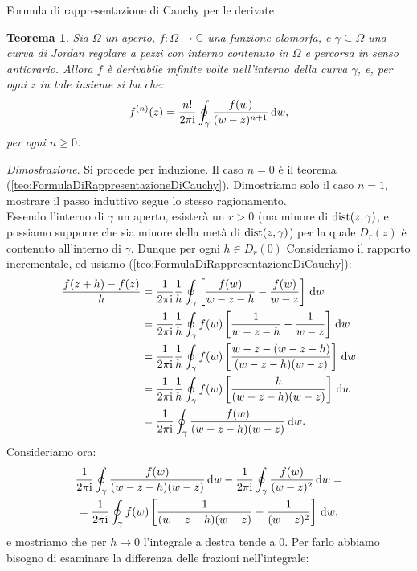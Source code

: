 \documentclass[11pt]{book}
\makeatletter
\theoremstyle{Definizione}
\theoremstyle{TeoremaProposizioneLemmaCorollarioCongettura}
\newtheorem{myteo}{Teorema}[section]
\theoremstyle{OsservazioneNotaEsempio}
\renewenvironment{proof}[1][\proofname]{\par
  \normalfont \topsep6\p@\@plus6\p@\relax
  \trivlist
  \item[\hskip\labelsep
        \itshape
    #1\@addpunct{.}]\ignorespaces
}{%
  \endtrivlist\@endpefalse
}
\renewenvironment{proof}{\textsl{Dimostrazione}.}{}
\newcommand{\C}{\mathbb{C}}
\newcommand{\Disc}[3][]{D^{#1}_{{#2}}({#3})}
\renewcommand{\i}{\textup{i}}
\renewcommand{\d}{\mathrm{d}}
\newcommand{\dw}{\,\d w}
\newcommand{\dist}{\textup{dist}}
\makeatother
\begin{document}
\begin{boxteo}{Formula di rappresentazione di Cauchy per le derivate}
\begin{myteo}\label{teo:FormulaDiRappresentazioneDiCauchyPerLeDerivate}
Sia $\Omega$ un aperto, $f:\Omega\longrightarrow \C$ una funzione olomorfa, e $\gamma\subseteq \Omega$ una curva di Jordan regolare a pezzi con interno contenuto in $\Omega$ e percorsa in senso antiorario. Allora $f$ è derivabile infinite volte nell'interno della curva $\gamma$, e, per ogni $z$ in tale insieme si ha che:
$$
f^{(n)}(z) = \frac{n!}{2\pi\i}\oint_{\gamma} \frac{f(w)}{(w-z)^{n+1}}\dw,
$$
per ogni $n \geq 0$.
\end{myteo}
\tcblower
\begin{proof}
Si procede per induzione. Il caso $n = 0$ è il teorema (\ref{teo:FormulaDiRappresentazioneDiCauchy}). Dimostriamo solo il caso $n = 1$, mostrare il passo induttivo segue lo stesso ragionamento.\\
Essendo l'interno di $\gamma$ un aperto, esisterà un $r > 0$ (ma minore di $\dist(z,\gamma)$, e possiamo supporre che sia minore della metà di $\dist(z,\gamma)$) per la quale $\Disc{r}{z}$ è contenuto all'interno di $\gamma$. Dunque per ogni $h\in \Disc{r}{0}$ Consideriamo il rapporto incrementale, ed usiamo (\ref{teo:FormulaDiRappresentazioneDiCauchy}):
\begin{align*}
\frac{f(z+h)-f(z)}{h} &= \frac{1}{2\pi\i}\frac{1}{h}\oint_{\gamma} \left[\frac{f(w)}{w-z-h}-\frac{f(w)}{w-z}\right]\dw \\
&= \frac{1}{2\pi\i}\frac{1}{h}\oint_{\gamma} f(w)\left[\frac{1}{w-z-h}-\frac{1}{w-z}\right]\dw\\
&= \frac{1}{2\pi\i}\frac{1}{h}\oint_{\gamma} f(w)\left[\frac{w-z-(w-z-h)}{(w-z-h)(w-z)}\right]\dw\\
&=\frac{1}{2\pi\i}\frac{1}{h}\oint_{\gamma} f(w)\left[\frac{h}{(w-z-h)(w-z)}\right]\dw\\
&= \frac{1}{2\pi\i}\oint_{\gamma} \frac{f(w)}{(w-z-h)(w-z)}\dw.
\end{align*}
Consideriamo ora:
\begin{multline*}
\frac{1}{2\pi\i}\oint_{\gamma} \frac{f(w)}{(w-z-h)(w-z)}\dw - \frac{1}{2\pi\i}\oint_{\gamma} \frac{f(w)}{(w-z)^2}\dw  =\\
= \frac{1}{2\pi\i} \oint_{\gamma} f(w)\left[\frac{1}{(w-z-h)(w-z)}-\frac{1}{(w-z)^2}\right]\dw,
\end{multline*}
e mostriamo che per $h\to 0$ l'integrale a destra tende a $0$. Per farlo abbiamo bisogno di esaminare la differenza delle frazioni nell'integrale:

\end{proof}
\end{boxteo}
\end{document}
